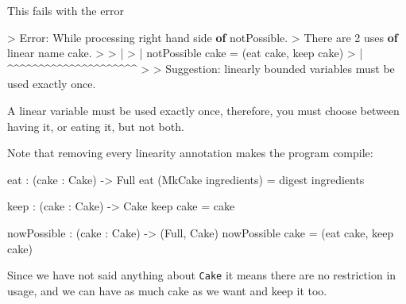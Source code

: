 \documentclass[
]{article}
\newenvironment{Shaded}{}{}
\newcommand{\DataTypeTok}[1]{\textcolor[rgb]{0.56,0.13,0.00}{#1}}
\newcommand{\DecValTok}[1]{\textcolor[rgb]{0.25,0.63,0.44}{#1}}
\newcommand{\KeywordTok}[1]{\textcolor[rgb]{0.00,0.44,0.13}{\textbf{#1}}}
\newcommand{\NormalTok}[1]{#1}
\newcommand{\OperatorTok}[1]{\textcolor[rgb]{0.40,0.40,0.40}{#1}}
\newcommand{\OtherTok}[1]{\textcolor[rgb]{0.00,0.44,0.13}{#1}}
\begin{document}
This fails with the error

\begin{Shaded}
\begin{Highlighting}[]
\OperatorTok{\textgreater{}} \DataTypeTok{Error}\OperatorTok{:} \DataTypeTok{While}\NormalTok{ processing right hand side }\KeywordTok{of}\NormalTok{ notPossible}\OperatorTok{.}
\OperatorTok{\textgreater{}}   \DataTypeTok{There}\NormalTok{ are }\DecValTok{2}\NormalTok{ uses }\KeywordTok{of}\NormalTok{ linear name cake}\OperatorTok{.}
\OperatorTok{\textgreater{}} 
\OperatorTok{\textgreater{}}     \OperatorTok{|}
\OperatorTok{\textgreater{}}     \OperatorTok{|}\NormalTok{ notPossible cake }\OtherTok{=}\NormalTok{ (eat cake, keep cake)}
\OperatorTok{\textgreater{}}     \OperatorTok{|}                    \OperatorTok{\^{}\^{}\^{}\^{}\^{}\^{}\^{}\^{}\^{}\^{}\^{}\^{}\^{}\^{}\^{}\^{}\^{}\^{}\^{}\^{}\^{}}
\OperatorTok{\textgreater{}} 
\OperatorTok{\textgreater{}} \DataTypeTok{Suggestion}\OperatorTok{:}\NormalTok{ linearly bounded variables must be used exactly once}\OperatorTok{.}
\end{Highlighting}
\end{Shaded}

A linear variable must be used exactly once, therefore, you must choose
between having it, or eating it, but not both.

Note that removing every linearity annotation makes the program compile:

\begin{Shaded}
\begin{Highlighting}[]
\NormalTok{eat }\OperatorTok{:}\NormalTok{ (cake }\OperatorTok{:} \DataTypeTok{Cake}\NormalTok{) }\OtherTok{{-}\textgreater{}} \DataTypeTok{Full}
\NormalTok{eat (}\DataTypeTok{MkCake}\NormalTok{ ingredients) }\OtherTok{=}\NormalTok{ digest ingredients}

\NormalTok{keep }\OperatorTok{:}\NormalTok{ (cake }\OperatorTok{:} \DataTypeTok{Cake}\NormalTok{) }\OtherTok{{-}\textgreater{}} \DataTypeTok{Cake}
\NormalTok{keep cake }\OtherTok{=}\NormalTok{ cake}

\NormalTok{nowPossible }\OperatorTok{:}\NormalTok{ (cake }\OperatorTok{:} \DataTypeTok{Cake}\NormalTok{) }\OtherTok{{-}\textgreater{}}\NormalTok{ (}\DataTypeTok{Full}\NormalTok{, }\DataTypeTok{Cake}\NormalTok{)}
\NormalTok{nowPossible cake }\OtherTok{=}\NormalTok{ (eat cake, keep cake)}
\end{Highlighting}
\end{Shaded}

Since we have not said anything about \texttt{Cake} it means there are
no restriction in usage, and we can have as much cake as we want and
keep it too.
\end{document}
